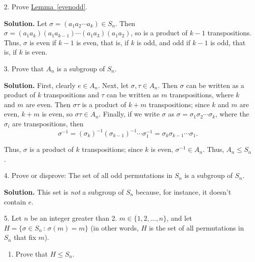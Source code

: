 \documentclass[10pt,]{book}
\theoremstyle{plain}
\theoremstyle{definition}
\theoremstyle{definition}
\theoremstyle{definition}
\theoremstyle{definition}
\numberwithin{equation}{section}
\begin{document}
\begin{exerciselist}
\begin{enumerate}[label=(\alph*)]
\end{enumerate}
%
\item[2.]\hypertarget{exercise-42}{}Prove \hyperref[evenodd]{Lemma~\ref{evenodd}}.%
\par\smallskip
\par\smallskip
\noindent\textbf{Solution.}\hypertarget{solution-42}{}\quad
Let \(\sigma=(a_1a_2\cdots a_k)\in S_n\). Then \(\sigma=(a_1a_k)(a_1a_{k-1})\cdots (a_1a_3)(a_1a_2)\), so is a product of \(k-1\) transpositions. Thus, \(\sigma\) is even if \(k-1\) is even, that is, if \(k\) is odd, and odd if \(k-1\) is odd, that is, if \(k\) is even.%
\item[3.]\hypertarget{exercise-43}{}Prove that \(A_n\) is a subgroup of \(S_n\).%
\par\smallskip
\par\smallskip
\noindent\textbf{Solution.}\hypertarget{solution-43}{}\quad
First, clearly \(e\in A_n\). Next, let \(\sigma, \tau \in A_n\). Then \(\sigma\) can be written as a product of \(k\) transpositions and \(\tau\) can be written as \(m\) transpositions, where \(k\) and \(m\) are even.  Then \(\sigma \tau\) is a product of \(k+m\) transpositions; since \(k\) and \(m\) are even, \(k+m\) is even, so \(\sigma\tau\in A_n\). Finally, if we write \(\sigma\) as \(\sigma= \sigma_1\sigma_2\cdots \sigma_k\), where the \(\sigma_i\) are transpositions, then%
\begin{equation*}
\sigma^{-1}=(\sigma_k)^{-1}(\sigma_{k-1})^{-1}\cdots \sigma_1^{-1}=\sigma_k\sigma_{k-1}\cdots \sigma_1.
\end{equation*}
%
\par
Thus, \(\sigma\) is a product of \(k\) transpositions; since \(k\) is even, \(\sigma^{-1}\in A_n\). Thus, \(A_n\leq S_n\).%
\item[4.]\hypertarget{exercise-44}{}Prove or disprove: The set of all odd permutations in \(S_n\) is a subgroup of \(S_n\).%
\par\smallskip
\par\smallskip
\noindent\textbf{Solution.}\hypertarget{solution-44}{}\quad
This set is \emph{not} a subgroup of \(S_n\) because, for instance, it doesn't contain \(e\).%
\item[5.]\hypertarget{exercise-45}{}Let \(n\) be an integer greater than 2. \(m \in \{1,2,\ldots,n\}\), and let \(H=\{\sigma\in S_n\,:\,\sigma(m)=m\}\) (in other words, \(H\) is the set of all permutations in \(S_n\) that fix \(m\)). \leavevmode%
\begin{enumerate}[label=(\alph*)]
\item\hypertarget{li-377}{}Prove that \(H\leq S_n\).%

\end{enumerate}
\end{exerciselist}
\end{document}

